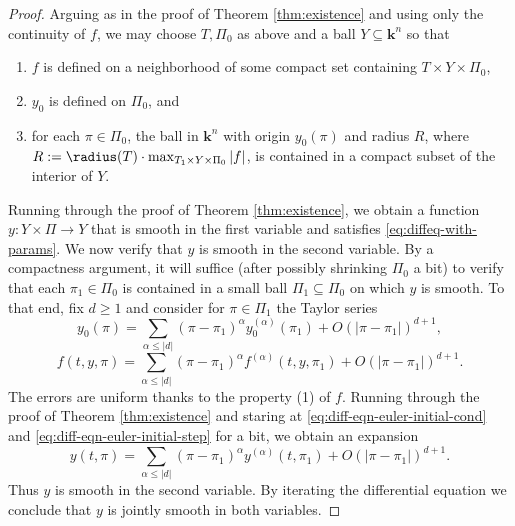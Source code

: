 \documentclass[reqno]{amsart} 
\begin{document}
\begin{proof}
  Arguing as in the proof of Theorem \ref{thm:existence} and using
  only the continuity of $f$,
  we may choose $T,\Pi_0$
  as above and a ball $Y \subseteq \mathbf{k}^n$
  so that
  \begin{enumerate}
  \item $f$ is defined on a neighborhood of some compact set containing $T \times Y \times \Pi_0$,
  \item $y_0$ is defined on $\Pi_0$,
    and
  \item for each $\pi \in \Pi_0$, the ball in $\mathbf{k}^n$
    with origin $y_0(\pi)$ and radius $R$, where
    $R := \radius(T) \cdot \max_{T_1 \times Y \times \Pi_0}|f|$,
    is contained in a compact subset of the interior of $Y$.
  \end{enumerate}
  Running through the proof of Theorem \ref{thm:existence},
  we obtain a function $y : Y \times \Pi \rightarrow Y$
  that is smooth in the first variable
  and satisfies \eqref{eq:diffeq-with-params}.
  We now verify that $y$ is smooth in the second
  variable.
  By a compactness argument, it will suffice
  (after possibly shrinking $\Pi_0$ a bit)
  to verify
  that each $\pi_1 \in \Pi_0$ is
  contained in a small ball $\Pi_1 \subseteq \Pi_0$
  on which $y$ is smooth.
  To that end, fix $d \geq 1$
  and consider for $\pi \in \Pi_1$
  the Taylor series
  \begin{equation*}
    y_0(\pi)
    =
    \sum_{\alpha \leq |d|}
    (\pi - \pi_1)^\alpha y_0^{(\alpha)}(\pi_1)
    + O(|\pi - \pi_1|)^{d + 1},
  \end{equation*}
  \begin{equation*}
    f(t,y,\pi)
    =
    \sum_{\alpha \leq |d|}
    (\pi - \pi_1)^\alpha 
    f^{(\alpha)}(t,y,\pi_1)
    + O(|\pi - \pi_1|)^{d + 1}.
  \end{equation*}
  The errors are uniform
  thanks to the property (1) of $f$.
  Running through the proof of Theorem \ref{thm:existence}
  and staring
  at
  \eqref{eq:diff-eqn-euler-initial-cond}
  and
  \eqref{eq:diff-eqn-euler-initial-step} for a bit,
  we obtain an expansion
  \begin{equation*}
    y(t,\pi)
    = \sum_{\alpha \leq |d|}
    (\pi - \pi_1)^\alpha 
    y^{(\alpha)}(t,\pi_1)
    + O(|\pi - \pi_1|)^{d + 1}.
  \end{equation*}
  Thus $y$ is smooth in the second variable.
  By iterating the differential equation we conclude that $y$ is jointly smooth in both variables.
\end{proof}
\end{document}
